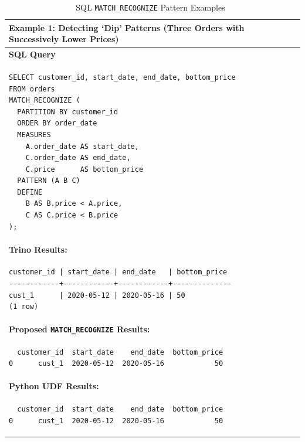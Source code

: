 \begin{longtable}{|p{}|}
\caption{SQL \texttt{MATCH\_RECOGNIZE} Pattern Examples~\cite{monierashraf2025rowmatch}}
\label{tab:sql-match-recognize-examples}\\
\hline
\multicolumn{1}{|l|}{\parbox{0.93\textwidth}{\textbf{Example 1: Detecting `Dip' Patterns
(Three Orders with Successively Lower Prices)}}} \\
\hline
\textbf{SQL Query} \\
\begin{minipage}{0.90\textwidth}
\begin{verbatim}
SELECT customer_id, start_date, end_date, bottom_price
FROM orders
MATCH_RECOGNIZE (
  PARTITION BY customer_id
  ORDER BY order_date
  MEASURES
    A.order_date AS start_date,
    C.order_date AS end_date,
    C.price      AS bottom_price
  PATTERN (A B C)
  DEFINE
    B AS B.price < A.price,
    C AS C.price < B.price
);
\end{verbatim}
\end{minipage} \\
\hline
\textbf{Trino Results:} \\
\begin{minipage}{0.90\textwidth}
\begin{verbatim}
customer_id | start_date | end_date   | bottom_price
------------+------------+------------+--------------
cust_1      | 2020-05-12 | 2020-05-16 | 50
(1 row)
\end{verbatim}
\end{minipage} \\
\hline
\textbf{Proposed \texttt{MATCH\_RECOGNIZE} Results:} \\
\begin{minipage}{0.90\textwidth}
\begin{verbatim}
  customer_id  start_date    end_date  bottom_price
0      cust_1  2020-05-12  2020-05-16            50
\end{verbatim}
\end{minipage} \\
\hline
\textbf{Python UDF Results:} \\
\begin{minipage}{0.90\textwidth}
\begin{verbatim}
  customer_id  start_date    end_date  bottom_price
0      cust_1  2020-05-12  2020-05-16            50
\end{verbatim}
\end{minipage} \\
\hline
\end{longtable}

